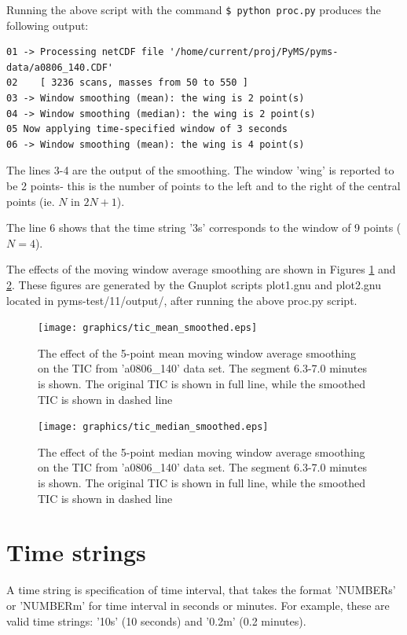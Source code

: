 Running the above script with the command {\tt \$ python proc.py} produces
the following output:

\begin{verbatim}
01 -> Processing netCDF file '/home/current/proj/PyMS/pyms-data/a0806_140.CDF'
02    [ 3236 scans, masses from 50 to 550 ]
03 -> Window smoothing (mean): the wing is 2 point(s)
04 -> Window smoothing (median): the wing is 2 point(s)
05 Now applying time-specified window of 3 seconds
06 -> Window smoothing (mean): the wing is 4 point(s)
\end{verbatim}

\noindent
The lines 3-4 are the output of the smoothing.  The window 'wing' is reported
to be 2 points- this is the number of points to the left and to the right of
the central points (ie. $N$ in $2N+1$).

\noindent
The line 6 shows that the time string '3s' corresponds to the window of
9 points ($N=4$).

The effects of the moving window average smoothing are shown in Figures 
\ref{fig:smoothed-mean} and \ref{fig:smoothed-median}. These figures are generated
by the Gnuplot scripts plot1.gnu and plot2.gnu located in
pyms-test/11/output/, after running the above proc.py script.

\begin{figure}[htp]
\begin{center}
\texttt{[image: graphics/tic\_mean\_smoothed.eps]}
\caption{The effect of the 5-point mean moving window average smoothing
on the TIC from 'a0806\_140' data set. The segment 6.3-7.0 minutes is
shown. The original TIC is shown in full line, while the smoothed TIC
is shown in dashed line}
\label{fig:smoothed-mean}
\end{center}
\end{figure}

\begin{figure}[htp]
\begin{center}
\texttt{[image: graphics/tic\_median\_smoothed.eps]}
\caption{The effect of the 5-point median moving window average smoothing
on the TIC from 'a0806\_140' data set. The segment 6.3-7.0 minutes is
shown. The original TIC is shown in full line, while the smoothed TIC
is shown in dashed line}
\label{fig:smoothed-median}
\end{center}
\end{figure}

\section{Time strings}
\label{sec:time-string}

A time string is specification of time interval, that takes the format
'NUMBERs' or 'NUMBERm' for time interval in seconds or minutes. For
example, these are valid time strings: '10s' (10 seconds) and '0.2m'
(0.2 minutes).


